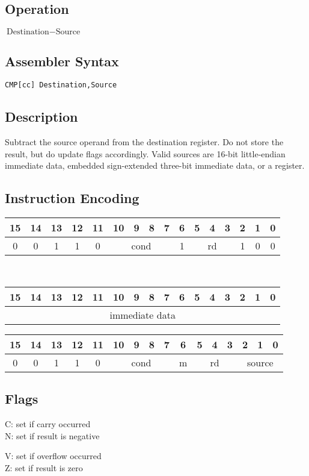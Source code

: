 \documentclass[11pt]{book}
\newcommand*{\encoding}[1]{\noindent
\begin{tabular}{|c|c|c|c|c|c|c|c|c|c|c|c|c|c|c|c|}
\multicolumn{1}{c}{15}&
\multicolumn{1}{c}{14}&
\multicolumn{1}{c}{13}&
\multicolumn{1}{c}{12}&
\multicolumn{1}{c}{11}&
\multicolumn{1}{c}{10}&
\multicolumn{1}{c}{9}&
\multicolumn{1}{c}{8}&
\multicolumn{1}{c}{7}&
\multicolumn{1}{c}{6}&
\multicolumn{1}{c}{5}&
\multicolumn{1}{c}{4}&
\multicolumn{1}{c}{3}&
\multicolumn{1}{c}{2}&
\multicolumn{1}{c}{1}&
\multicolumn{1}{c}{0}\\\hline
#1\\\hline
\end{tabular}}
\newcommand*{\instruction}[2][]{%
  \clearpage
  \thispagestyle{fancy}%
  \fancyhf[HL,HR]{\huge{#2}}%
  \fancyhf[HC]{#1}\addtocounter{section}{1}\noindent
}
\begin{document}

\instruction[Compare]{CMP}
\subsection*{Operation}
\(\text{Destination}-\text{Source}\)

\subsection*{Assembler Syntax}
\texttt{CMP[cc] Destination,Source}

\subsection*{Description}
Subtract the source operand from the destination register.
Do not store the result, but do update flags accordingly.
Valid sources are 16-bit little-endian immediate data,
embedded sign-extended three-bit immediate data,
or a register.

\subsection*{Instruction Encoding}
\encoding{0&0&1&1&0%
&\multicolumn{4}{|c|}{cond}%
&1&\multicolumn{3}{|c|}{rd}&1&0&0}\\\null\qquad
\encoding{\multicolumn{16}{|c|}{immediate data}}

\vspace{2\baselineskip}
\encoding{0&0&1&1&0%
&\multicolumn{4}{|c|}{cond}%
&m&\multicolumn{3}{|c|}{rd}&\multicolumn{3}{|c|}{source}}

\subsection*{Flags}
\begin{multicols}{2}\noindent
  C: set if carry occurred\\
  N: set if result is negative

  \columnbreak\noindent
  V: set if overflow occurred\\
  Z: set if result is zero
\end{multicols}
\end{document}
